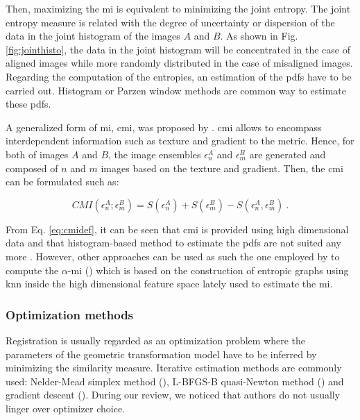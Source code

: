 Then, maximizing the \ac{mi} is equivalent to minimizing the joint entropy. The joint entropy measure is related with the degree of uncertainty or dispersion of the data in the joint histogram of the images $A$ and $B$. As shown in Fig. \ref{fig:jointhisto}, the data in the joint histogram will be concentrated in the case of aligned images while more randomly distributed in the case of misaligned images. Regarding the computation of the entropies, an estimation of the \acp{pdf} have to be carried out. Histogram or Parzen window methods are common way to estimate these \acp{pdf}.

A generalized form of \ac{mi}, \ac{cmi}, was proposed by \cite{Chappelow2011}. \ac{cmi} allows to encompass interdependent information such as texture and gradient to the metric. Hence, for both of images $A$ and $B$, the image ensembles $\epsilon^{A}_n$ and $\epsilon^{B}_m$ are generated and composed of $n$ and $m$ images based on the texture and gradient. Then, the \ac{cmi} can be formulated such as:

\begin{equation}
	CMI(\epsilon^{A}_n;\epsilon^{B}_m) = S(\epsilon^{A}_n) + S(\epsilon^{B}_m) - S(\epsilon^{A}_n,\epsilon^{B}_m) \ .
	\label{eq:cmidef}
\end{equation}

From Eq. \ref{eq:cmidef}, it can be seen that \ac{cmi} is provided using high dimensional data and that histogram-based method to estimate the \acp{pdf} are not suited any more \cite{Chappelow2011}. However, other approaches can be used as such the one employed by \cite{Staring2009} to compute the $\alpha$-\ac{mi} (\cite{Hero2002}) which is based on the construction of entropic graphs using \ac{knn} inside the high dimensional feature space lately used to estimate the \ac{mi}.

\subsubsection{Optimization methods}\label{subsubsec:optmea}

Registration is usually regarded as an optimization problem where the parameters of the geometric transformation model have to be inferred by minimizing the similarity measure. Iterative estimation methods are commonly used: Nelder-Mead simplex method (\cite{Nelder1965}), L-BFGS-B quasi-Newton method (\cite{Byrd1995}) and gradient descent (\cite{Viola1997}). During our review, we noticed that authors do not usually linger over optimizer choice.

